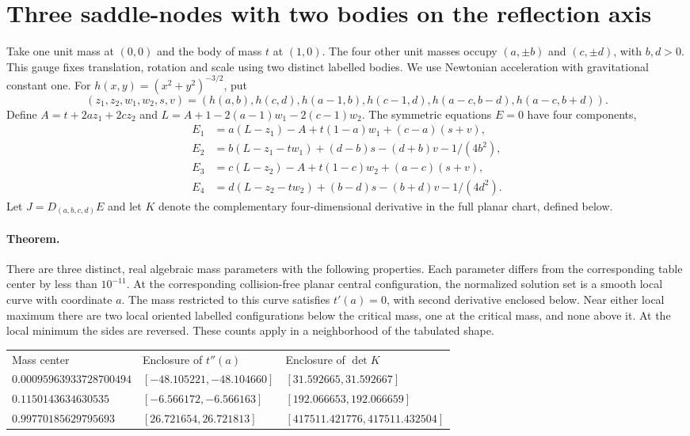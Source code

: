 \documentclass[11pt]{article}
\begin{document}
\section{Three saddle-nodes with two bodies on the reflection axis}
\label{sec:two-axial-folds}
Take one unit mass at $(0,0)$ and the body of mass $t$ at $(1,0)$.
The four other unit masses occupy $(a,\pm b)$ and $(c,\pm d)$, with $b,d>0$.
This gauge fixes translation, rotation and scale using two distinct labelled
bodies. We use Newtonian acceleration with gravitational constant one.
For $h(x,y)=(x^2+y^2)^{-3/2}$, put
\[
 (z_1,z_2,w_1,w_2,s,v)=
 (h(a,b),h(c,d),h(a-1,b),h(c-1,d),h(a-c,b-d),h(a-c,b+d)).
\]
Define $A=t+2az_1+2cz_2$ and $L=A+1-2(a-1)w_1-2(c-1)w_2$.
The symmetric equations $E=0$ have four components,
\begin{align*}
 E_1 &= a(L-z_1)-A+t(1-a)w_1+(c-a)(s+v),\\
 E_2 &= b(L-z_1-tw_1)+(d-b)s-(d+b)v-1/(4b^2),\\
 E_3 &= c(L-z_2)-A+t(1-c)w_2+(a-c)(s+v),\\
 E_4 &= d(L-z_2-tw_2)+(b-d)s-(b+d)v-1/(4d^2).
\end{align*}
Let $J=D_{(a,b,c,d)}E$ and let $K$ denote the complementary four-dimensional
derivative in the full planar chart, defined below.

\paragraph{Theorem.}
There are three distinct, real algebraic mass parameters with the following
properties. Each parameter differs from the corresponding table center by
less than $10^{-11}$. At the corresponding collision-free planar central
configuration, the normalized solution set is a smooth local curve with
coordinate $a$. The mass restricted to this curve satisfies $t'(a)=0$,
with second derivative enclosed below. Near either local maximum there are
two local oriented labelled configurations below the critical mass, one at
the critical mass, and none above it. At the local minimum the sides are
reversed. These counts apply in a neighborhood of the tabulated shape.
\begin{center}
\begin{tabular}{lll}
Mass center & Enclosure of $t''(a)$ & Enclosure of $\det K$\\
$0.00095963933728700494$ & $[-48.105221,-48.104660]$ & $[31.592665,31.592667]$\\
$0.1150143634630535$ & $[-6.566172,-6.566163]$ & $[192.066653,192.066659]$\\
$0.99770185629795693$ & $[26.721654,26.721813]$ & $[417511.421776,417511.432504]$
\end{tabular}
\end{center}
\end{document}
